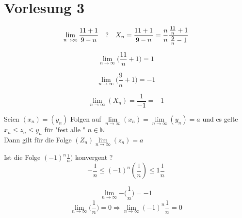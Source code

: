 \section{Vorlesung 3}

\begin{example}

\end{example}
\begin{equation}
    \lim\limits_{n \rightarrow \infty}{\frac{11+1}{9-n}}\quad ? \\
    \\\quad X_n = \frac{11+1}{9-n}=\frac{n}{n} \frac{\frac{11}{n}+1}{\frac{9}{n}-1}
\end{equation}

\begin{equation}
    \lim\limits_{n \rightarrow \infty}{\bigg(\frac{11}{n}+1\bigg)}=1
\end{equation}

\begin{equation}
    \lim\limits_{n \rightarrow \infty}{\bigg(\frac{9}{n}+1\bigg)}=-1
\end{equation}

\begin{equation}
    \lim\limits_{n \rightarrow \infty}{(X_n)}= \frac{1}{-1}=-1
\end{equation}

\begin{lemma}
    Seien $(x_n)=(y_n)$ Folgen auf $\lim\limits_{n \rightarrow \infty}{(x_n)}= \lim\limits_{n \rightarrow \infty}{(y_n)}= a$ und es gelte
    $x_n \leq z_n \leq y_n$ für "fest alle " $n \in \mathbb{N}$\\

    Dann gilt für die Folge $(Z_n) \lim\limits_{n \rightarrow \infty}{(z_n)}=a$
\end{lemma}

\begin{example}
    Ist die Folge $(-1)^n\frac{1}{n})$ konvergent ?\\

    \[ - \frac{1}{n} \leq(-1)^n(\frac{1}{n}) \leq 1 \frac{1}{n}\]

    \[ \lim\limits_{n \rightarrow \infty}{- \big(\frac{1}{n} \big)}= -1 \]
    \[ \lim\limits_{n \rightarrow \infty}{ \big(\frac{1}{n} \big)}= 0 \Rightarrow \lim\limits_{n \rightarrow \infty}{(-1)^n \frac{1}{n}}= 0
    \]
\end{example}

\newpage

